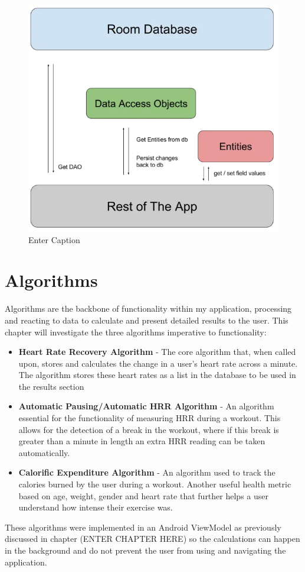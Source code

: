 \documentclass{l4proj}
\begin{document}
\begin{figure}[h]
    \centering
    \includegraphics[width=0.5\linewidth]{dissertation//dissImages/RoomDatabaseStructure.png}
    \caption{Enter Caption}
    \label{fig:enter-label}
\end{figure}

\section{Algorithms}

Algorithms are the backbone of functionality within my application, processing and reacting to data to calculate and present detailed results to the user. This chapter will investigate the three algorithms imperative to functionality:

\begin{itemize}
    \item \textbf{Heart Rate Recovery Algorithm} - The core algorithm that, when called upon, stores and calculates the change in a user’s heart rate across a minute. The algorithm stores these heart rates as a list in the database to be used in the results section
    \item \textbf{Automatic Pausing/Automatic HRR Algorithm} - An algorithm essential for the functionality of measuring HRR during a workout. This allows for the detection of a break in the workout, where if this break is greater than a minute in length an extra HRR reading can be taken automatically.
    \item \textbf{Calorific Expenditure Algorithm} - An algorithm used to track the calories burned by the user during a workout. Another useful health metric based on age, weight, gender and heart rate that further helps a user understand how intense their exercise was.
\end{itemize}

These algorithms were implemented in an Android ViewModel as previously discussed in chapter (ENTER CHAPTER HERE) so the calculations can happen in the background and do not prevent the user from using and navigating the application.
\end{document}
